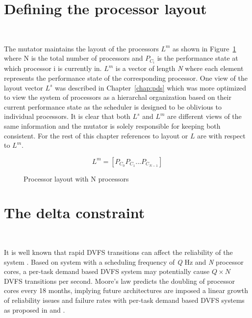 \section{Defining the processor layout}~\label{sec:layout}

The mutator maintains the layout of the processors $L^m$ as shown in Figure~\ref{fig:mutator_layout_view}
where N is the total number of processors and 
$P_{C_{i}}$ is the performance state at which processor i is currently in. $L^m$
is a vector of length \textit{N} where each element represents the performance state
of the corresponding processor. 
One view of the layout vector $L^s$ was described in Chapter~\ref{chap:pds} 
which was more optimized to view the system of processors as a hierarchal organization
based on their current performance state as the scheduler is designed to be oblivious to individual processors. 
It is clear that both $L^s$ and $L^m$ are different views of the same information and 
the mutator is solely responsible for keeping both consistent. For the rest of this chapter
references to layout or $L$ are with respect to $L^m$. 

\begin{figure}[h!]
\centering
\begin{equation*}
    L^m = [ P_{C_{0}} P_{C_{1}} ... P_{C_{N-1}} ]
\end{equation*}
\caption{Processor layout with N processors}
\label{fig:mutator_layout_view}
\end{figure}


\section{The delta constraint}~\label{sec:delta_constraint}


It is well known that rapid DVFS transitions can affect the reliability of the system \cite{ImpactDVFS}.
Based on system with a scheduling frequency of \textit{Q} Hz
and \textit{N} processor cores, a per-task demand based DVFS system may potentially cause $Q \times N$ 
DVFS transitions per second. Moore's law predicts the doubling of processor cores every 18 months, implying
future architectures are imposed a linear growth of reliability issues and failure rates with per-task
demand based DVFS systems as proposed in \cite{LiveRuntime} and \cite{Phaseaware}. 

